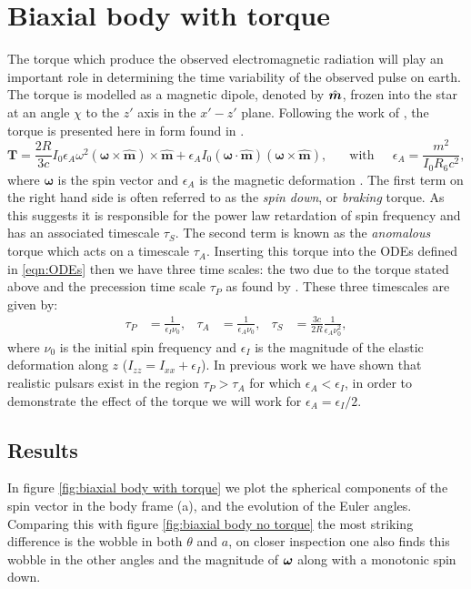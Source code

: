 \documentclass[11pt]{article}
\numberwithin{equation}{section}
\numberwithin{figure}{section}
\numberwithin{table}{section}
\begin{document}
\section{Biaxial body with torque}
The torque which produce the observed electromagnetic radiation will play an important role in determining the time variability of the observed pulse on earth. The torque is modelled as a magnetic dipole, denoted by $\hat{\boldsymbol{m}}$, frozen into the star at an angle $\chi$ to the $z'$ axis in the $x'-z'$ plane. Following the work of \citet{Deutsch1955}, the torque is presented here in form found in \citet{Goldreich1970}.
\begin{equation}
\boldsymbol{T}=\frac{2R}{3c} I_{0}\epsilon_{A}\omega^{2}(\boldsymbol{\omega} \times \hat{\boldsymbol{m}})\times \hat{\boldsymbol{m}} + \epsilon_{A}I_{0}(\boldsymbol{\omega} \cdot \hat{\boldsymbol{m}})(\boldsymbol{\omega} \times \hat{\boldsymbol{m}}), \;\;\;\;\; \textrm{ with } \;\;\;\; \epsilon_{A} = \frac{m^{2}}{I_{0}R_{6}c^{2}},
\label{eqn:torque}
\end{equation}
where $\boldsymbol{\omega}$ is the spin vector and $\epsilon_{A}$ is the magnetic deformation \citep[see][]{Glampedakis2010}.
The first term on the right hand side is often referred to as the \emph{spin down}, or \emph{braking} torque. As this suggests it is responsible for the power law retardation of spin frequency and has an associated timescale $\tau_{S}$. The second term is known as the \emph{anomalous} torque which acts on a timescale $\tau_{A}$. Inserting this torque into the ODEs defined in \eqref{eqn:ODEs} then we have three time scales: the two due to the torque stated above and the precession time scale $\tau_{P}$ as found by \citet{Jones2001}. These three timescales are given by:
\begin{align}
\tau_{P} &= \frac{1}{\epsilon_{I}\nu_{0}},  &  \tau_{A}&=\frac{1}{\epsilon_{A}\nu_{0}}, & \tau_{S}&=\frac{3c}{2R}\frac{1}{\epsilon_{A}\nu_{0}^{2}},
\label{eqn:timescales}
\end{align} 
where $\nu_{0}$ is the initial spin frequency and $\epsilon_{I}$ is the magnitude of the elastic deformation along $z$ ($I_{zz} = I_{xx} + \epsilon_{I}$). In previous work we have shown %
that realistic pulsars exist in the region $\tau_{P} > \tau_{A}$ for which $\epsilon_{A} < \epsilon_{I}$, in order to demonstrate the effect of the torque we will work for $\epsilon_{A} = \epsilon_{I}/2$. 
\subsection{Results}
In figure \ref{fig:biaxial body with torque} we plot the spherical components of the spin vector in the body frame (a), and the evolution of the Euler angles. Comparing this with figure \ref{fig:biaxial body no torque} the most striking difference is the wobble in both $\theta$ and $a$, on closer inspection one also finds this wobble in the other angles and the magnitude of $\boldsymbol{\omega}$ along with a monotonic spin down.
\end{document}
